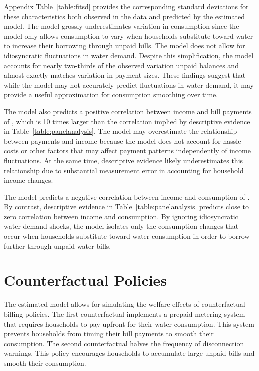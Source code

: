 \documentclass[12pt,table]{article}
\begin{document}
Appendix Table~\ref{table:fitsd} provides the corresponding standard deviations for these characteristics both observed in the data and predicted by the estimated model.  The model grossly underestimates variation in consumption since the model only allows consumption to vary when households substitute toward water to increase their borrowing through unpaid bills.  The model does not allow for idiosyncratic fluctuations in water demand.  Despite this simplification, the model accounts for nearly two-thirds of the observed variation unpaid balances and almost exactly matches variation in payment sizes.  These findings suggest that while the model may not accurately predict fluctuations in water demand, it may provide a useful approximation for consumption smoothing over time.

The model also predicts a positive correlation between income and bill payments of \unskip, which is 10 times larger than the correlation implied by descriptive evidence in Table~\ref{table:panelanalysis}.  The model may overestimate the relationship between payments and income because the model does not account for hassle costs or other factors that may affect payment patterns independently of income fluctuations.  At the same time, descriptive evidence likely underestimates this relationship due to substantial measurement error in accounting for household income changes.  

The model predicts a negative correlation between income and consumption of \unskip.  By contrast, descriptive evidence in Table~\ref{table:panelanalysis} predicts close to zero correlation between income and consumption.   By ignoring idiosyncratic water demand shocks, the model isolates only the consumption changes that occur when households substitute toward water consumption in order to borrow further through unpaid water bills. 





\section{Counterfactual Policies}\label{section:counterfactuals}

The estimated model allows for simulating the welfare effects of counterfactual billing policies.  The first counterfactual implements a prepaid metering system that requires households to pay upfront for their water consumption.  This system prevents households from timing their bill payments to smooth their consumption.  The second counterfactual halves the frequency of disconnection warnings.  This policy encourages households to accumulate large unpaid bills and smooth their consumption. 
\end{document}
